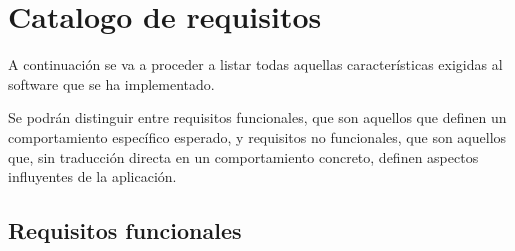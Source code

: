 \section{Catalogo de requisitos}

A continuación se va a proceder a listar todas aquellas características exigidas al software que se ha implementado.

Se podrán distinguir entre requisitos funcionales, que son aquellos que definen un comportamiento específico esperado, y requisitos no funcionales, que son aquellos que, sin traducción directa en un comportamiento concreto, definen aspectos influyentes de la aplicación.

\subsection{Requisitos funcionales}

